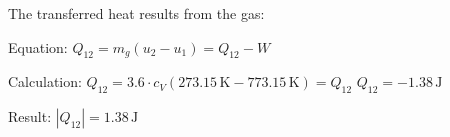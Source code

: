 The transferred heat results from the gas:  

Equation:  
\( Q_{12} = m_g (u_2 - u_1) = Q_{12} - W \)  

Calculation:  
\( Q_{12} = 3.6 \cdot c_V (273.15 \, \text{K} - 773.15 \, \text{K}) = Q_{12} \)  
\( Q_{12} = -1.38 \, \text{J} \)  

Result:  
\( |Q_{12}| = 1.38 \, \text{J} \)